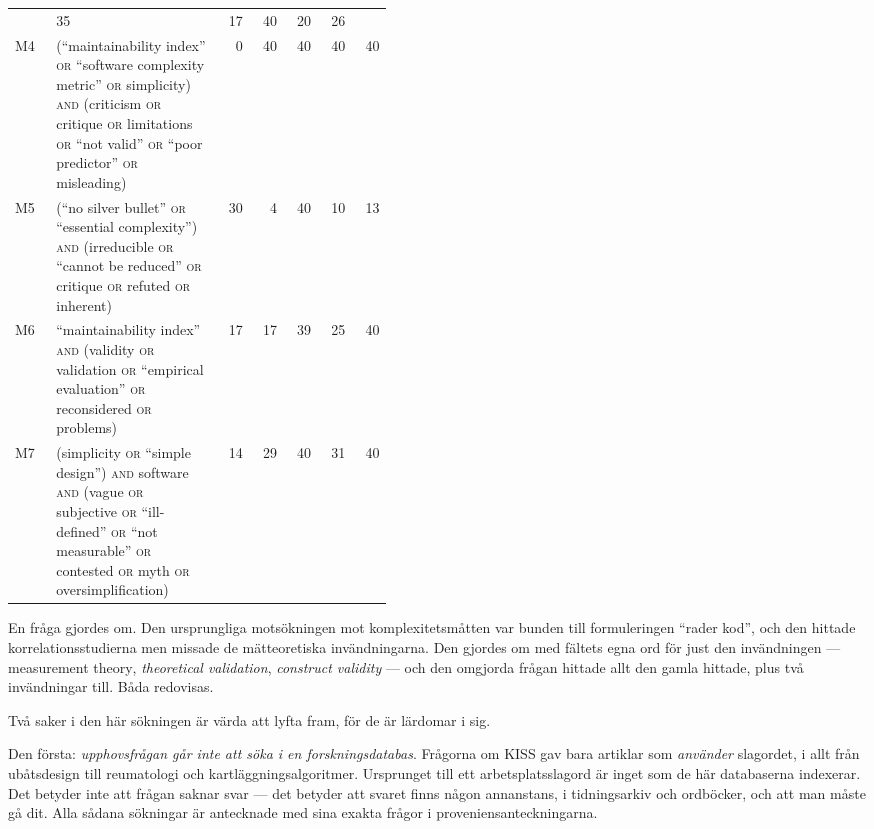 \begin{table}[htbp]
\begin{sidecaption}
\begin{tabular}{@{}lp{0.44\linewidth}rrrrr@{}}
         & 35 & 17 & 40 & 20 & 26 \\
      M4 & (\enquote{maintainability index} \textsc{or} \enquote{software complexity metric} \textsc{or} simplicity) \textsc{and} (criticism \textsc{or} critique \textsc{or} limitations \textsc{or} \enquote{not valid} \textsc{or} \enquote{poor predictor} \textsc{or} misleading)
         & 0 & 40 & 40 & 40 & 40 \\
      M5 & (\enquote{no silver bullet} \textsc{or} \enquote{essential complexity}) \textsc{and} (irreducible \textsc{or} \enquote{cannot be reduced} \textsc{or} critique \textsc{or} refuted \textsc{or} inherent)
         & 30 & 4 & 40 & 10 & 13 \\
      M6 & \enquote{maintainability index} \textsc{and} (validity \textsc{or} validation \textsc{or} \enquote{empirical evaluation} \textsc{or} reconsidered \textsc{or} problems)
         & 17 & 17 & 39 & 25 & 40 \\
      M7 & (simplicity \textsc{or} \enquote{simple design}) \textsc{and} software \textsc{and} (vague \textsc{or} subjective \textsc{or} \enquote{ill-defined} \textsc{or} \enquote{not measurable} \textsc{or} contested \textsc{or} myth \textsc{or} oversimplification)
         & 14 & 29 & 40 & 31 & 40 \\
      \bottomrule
    \end{tabular}
  \end{sidecaption}
\end{table}

En fråga gjordes om.  Den ursprungliga motsökningen mot komplexitetsmåtten
var bunden till formuleringen \enquote{rader kod}, och den hittade
korrelationsstudierna men missade de mätteoretiska invändningarna.  Den
gjordes om med fältets egna ord för just den invändningen ---
\foreignlanguage{english}{measurement theory}, \emph{theoretical
validation}, \emph{construct validity} --- och den omgjorda frågan hittade
allt den gamla hittade, plus två invändningar till.  Båda redovisas.

Två saker i den här sökningen är värda att lyfta fram, för de är lärdomar i
sig.

Den första: \emph{upphovsfrågan går inte att söka i en forskningsdatabas}.
Frågorna om KISS gav bara artiklar som \emph{använder} slagordet, i allt
från ubåtsdesign till reumatologi och kartläggningsalgoritmer.  Ursprunget
till ett arbetsplatsslagord är inget som de här databaserna indexerar.  Det
betyder inte att frågan saknar svar --- det betyder att svaret finns
någon annanstans, i tidningsarkiv och ordböcker, och att man måste gå dit.
Alla sådana sökningar är antecknade med sina exakta frågor i
proveniensanteckningarna.

